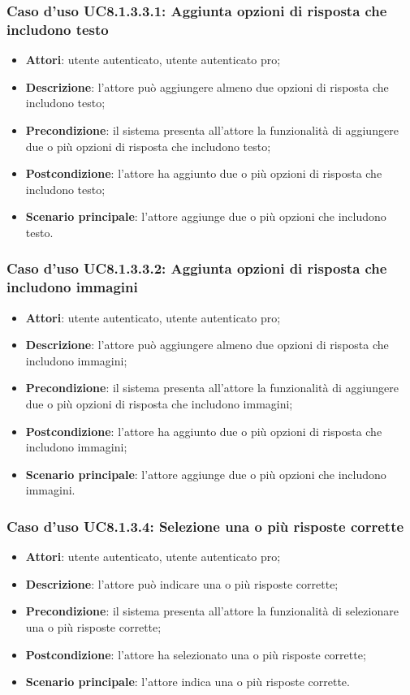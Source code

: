 \subsubsection{Caso d'uso UC8.1.3.3.1: Aggiunta opzioni di risposta che includono testo}
	\begin{itemize}
		\item
			\textbf{Attori}: utente autenticato, utente autenticato pro;
		\item		
			\textbf{Descrizione}: l'attore può aggiungere almeno due opzioni di risposta che includono testo;
		\item
			\textbf{Precondizione}: il sistema presenta all'attore la funzionalità di aggiungere due o più opzioni di risposta che includono testo;
		\item
			\textbf{Postcondizione}: l'attore ha aggiunto due o più opzioni di risposta che includono testo;
		\item
			\textbf{Scenario principale}: l'attore aggiunge due o più opzioni che includono testo.				
	\end{itemize}	

\subsubsection{Caso d'uso UC8.1.3.3.2: Aggiunta opzioni di risposta che includono immagini}
	\begin{itemize}
		\item
			\textbf{Attori}: utente autenticato, utente autenticato pro;
		\item		
			\textbf{Descrizione}: l'attore può aggiungere almeno due opzioni di risposta che includono immagini;
		\item
			\textbf{Precondizione}: il sistema presenta all'attore la funzionalità di aggiungere due o più opzioni di risposta che includono immagini;
		\item
			\textbf{Postcondizione}: l'attore ha aggiunto due o più opzioni di risposta che includono immagini;
		\item
			\textbf{Scenario principale}: l'attore aggiunge due o più opzioni che includono immagini. 				
	\end{itemize}	
		
\subsubsection{Caso d'uso UC8.1.3.4: Selezione una o più risposte corrette}
	\begin{itemize}
		\item
			\textbf{Attori}: utente autenticato, utente autenticato pro;
		\item		
			\textbf{Descrizione}: l'attore può indicare una o più risposte corrette;
		\item
			\textbf{Precondizione}: il sistema presenta all'attore la funzionalità di selezionare una o più risposte corrette;
		\item
			\textbf{Postcondizione}: l'attore ha selezionato una o più risposte corrette;
		\item
			\textbf{Scenario principale}: l'attore indica una o più risposte corrette. 			
	\end{itemize}